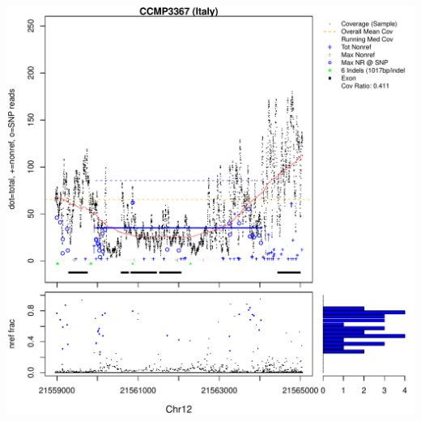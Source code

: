 \documentclass{article}\usepackage[]{graphicx}\usepackage[]{color}
\makeatletter
\def\maxwidth{ %
  \ifdim\Gin@nat@width>\linewidth
    \linewidth
  \else
    \Gin@nat@width
  \fi
}
\newenvironment{knitrout}{}{} %
\makeatother
\begin{document}
\begin{knitrout}
{\includegraphics[width=\maxwidth]{figs-knitr/unnamed-chunk-53-7} 

}



\end{knitrout}
\end{document}
